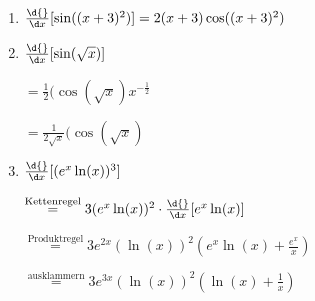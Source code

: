 \item
\begin{enumerate}

\item $\frac{\d{}}{\d x} \lbrack \sin((x+3)^2) \rbrack = 2(x+3)\cos((x+3)^2)$

\item

$\frac{\d{}}{\d x} \lbrack \sin(\sqrt x) \rbrack$

$=\frac{1}{2}(\cos(\sqrt x)x^{-\frac{1}{2}}$

$=\frac{1}{2\sqrt{x}}(\cos(\sqrt x)$

\item

$\frac{\d{}}{\d x} \lbrack (e^x \ln(x))^3 \rbrack $

$\stackrel{\text{Kettenregel}}{=} 3(e^x\ln(x))^2 \cdot \frac{\d{}}{\d x}[e^x\ln(x)]$

$\stackrel{\text{Produktregel}}{=} 3e^{2x}(\ln(x))^2(e^x\ln(x)+\frac{e^x}{x})$

$\stackrel{\text{ausklammern}}{=} 3e^{3x}(\ln(x))^2(\ln(x)+\frac{1}{x})$
\end{enumerate}

